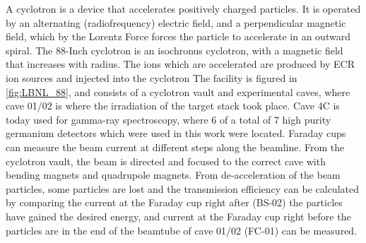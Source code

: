 \noindent 
A cyclotron is a device that accelerates positively charged particles. It is operated by an alternating (radiofrequency) electric field, and a perpendicular magnetic field, which by the Lorentz Force forces the particle to accelerate in an outward spiral. The 88-Inch cyclotron is an isochronus cyclotron, with a magnetic field that increases with radius. The ions which are accelerated are produced by ECR ion sources and injected into the cyclotron %
The facility is figured in \ref{fig:LBNL_88}, and consists of a cyclotron vault and experimental caves, where cave 01/02 is where the irradiation of the target stack took place. Cave 4C is today used for gamma-ray spectroscopy, where 6 of a total of 7 high purity germanium detectors which were used in this work were located. Faraday cups can measure the beam current at different steps along the beamline. %
From the cyclotron vault, the beam is directed and focused to the correct cave with bending magnets and quadrupole magnets. From de-acceleration of the beam particles, some particles are lost and the transmission efficiency can be calculated by comparing the current at the Faraday cup right after (BS-02) the particles have gained the desired energy, and current at the Faraday cup right before the particles are in the end of the beamtube of cave 01/02 (FC-01) can be measured.  



